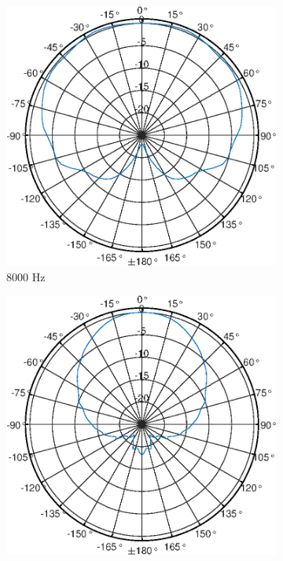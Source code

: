 \begin{figure}[b]
    \centering
    \begin{subfigure}{.33\textwidth}
        \centering
        \includegraphics[width=0.95\linewidth]{Figures/KM184_8000Hz}
        \caption{8000 Hz}
        \label{fig:Polar_8000}
    \end{subfigure}%
    \begin{subfigure}{.33\textwidth}
        \centering
        \includegraphics[width=0.95\linewidth]{Figures/KM184_16000Hz}

\end{subfigure}
\end{figure}
